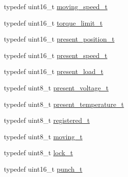 \begin{DoxyCompactItemize}
\item 
typedef uint16\+\_\+t \hyperlink{structdynamixel_1_1servos_1_1_model_traits_3_01_ax18_01_4_1_1_c_t_a40a1e05199d76860d6272bcf9fd34b22}{moving\+\_\+speed\+\_\+t}
\item 
typedef uint16\+\_\+t \hyperlink{structdynamixel_1_1servos_1_1_model_traits_3_01_ax18_01_4_1_1_c_t_a0e0aa42e2cd42ab34630a10ac4273916}{torque\+\_\+limit\+\_\+t}
\item 
typedef uint16\+\_\+t \hyperlink{structdynamixel_1_1servos_1_1_model_traits_3_01_ax18_01_4_1_1_c_t_acf26eb97d6f21257d4cb75c9da0a32a6}{present\+\_\+position\+\_\+t}
\item 
typedef uint16\+\_\+t \hyperlink{structdynamixel_1_1servos_1_1_model_traits_3_01_ax18_01_4_1_1_c_t_ad02ce0b68a3ce569a727ea0a1300d7a7}{present\+\_\+speed\+\_\+t}
\item 
typedef uint16\+\_\+t \hyperlink{structdynamixel_1_1servos_1_1_model_traits_3_01_ax18_01_4_1_1_c_t_a6aada85791ae25567be9069e2b65f871}{present\+\_\+load\+\_\+t}
\item 
typedef uint8\+\_\+t \hyperlink{structdynamixel_1_1servos_1_1_model_traits_3_01_ax18_01_4_1_1_c_t_a503bc1789e607e13d08bc86aa965c2f4}{present\+\_\+voltage\+\_\+t}
\item 
typedef uint8\+\_\+t \hyperlink{structdynamixel_1_1servos_1_1_model_traits_3_01_ax18_01_4_1_1_c_t_a93ae1895a82ec4868811e075db8fa826}{present\+\_\+temperature\+\_\+t}
\item 
typedef uint8\+\_\+t \hyperlink{structdynamixel_1_1servos_1_1_model_traits_3_01_ax18_01_4_1_1_c_t_a5d63bf5572bb872f4525918cf173faa3}{registered\+\_\+t}
\item 
typedef uint8\+\_\+t \hyperlink{structdynamixel_1_1servos_1_1_model_traits_3_01_ax18_01_4_1_1_c_t_af48629ec3edad1638b97c92156273bd4}{moving\+\_\+t}
\item 
typedef uint8\+\_\+t \hyperlink{structdynamixel_1_1servos_1_1_model_traits_3_01_ax18_01_4_1_1_c_t_a3f5b0a087c65fad76363e2502da13f7d}{lock\+\_\+t}
\item 
typedef uint16\+\_\+t \hyperlink{structdynamixel_1_1servos_1_1_model_traits_3_01_ax18_01_4_1_1_c_t_a75c0e3c09add9f3423695f9b29f1ac6e}{punch\+\_\+t}
\end{DoxyCompactItemize}
